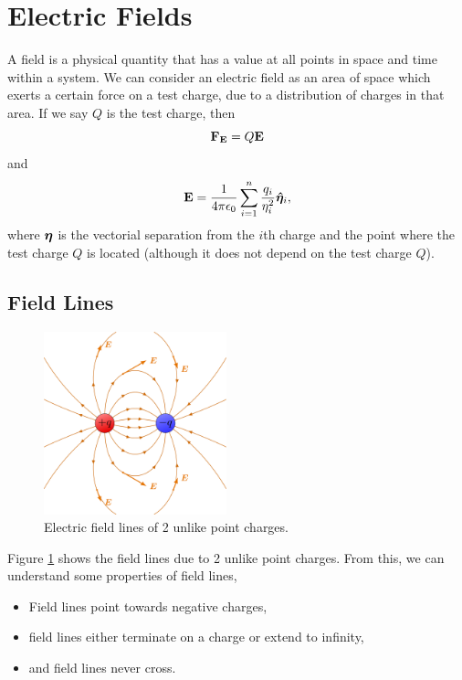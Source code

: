 \documentclass{book}
\begin{document}
\section{Electric Fields}
A field is a physical quantity that has a value at all points in space and time within a system. We can consider an electric field as an area of space which exerts a certain force on a test charge, due to a distribution of charges in that area. If we say $Q$ is the test charge, then
\begin{equation}
    \vb{F_E} = Q\vb{E}
\end{equation}
and
\begin{equation}
    \vb{E} = \frac{1}{4\pi\epsilon_0}\sum_{i=1}^n\frac{q_i}{\eta^2_i}\vu*{\eta}_i,
\end{equation}
where $\vb*{\eta}$ is the vectorial separation from the $i$th charge and the point where the test charge $Q$ is located (although it does not depend on the test charge $Q$).
\subsection{Field Lines}
\begin{figure}[h]
    \centering
    \includegraphics[width=150pt]{electric_fieldlines2-001.png}
    \caption{Electric field lines of 2 unlike point charges.}
    \label{fig:fieldlines}
\end{figure}
Figure \ref{fig:fieldlines} shows the field lines due to 2 unlike point charges. From this, we can understand some properties of field lines,
\begin{itemize}
    \item Field lines point towards negative charges,
    \item field lines either terminate on a charge or extend to infinity,
    \item and field lines never cross.
\end{itemize}
\end{document}
